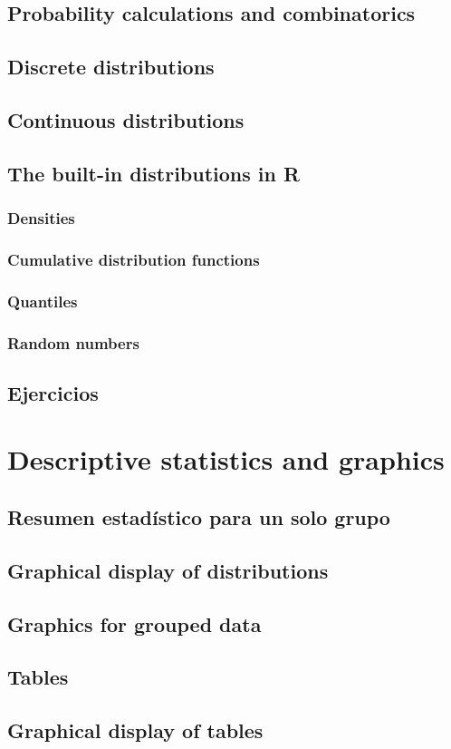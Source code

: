 \documentclass[spanish]{extbook}
\numberwithin{equation}{section}
\numberwithin{figure}{section}
\begin{document}
\section{Probability calculations and combinatorics}
\section{Discrete distributions}
\section{Continuous distributions}
\section{The built-in distributions in R}
\subsection{Densities}
\subsection{Cumulative distribution functions}
\subsection{Quantiles}
\subsection{Random numbers}
\section{Ejercicios}

\chapter{Descriptive statistics and graphics}
\section{Resumen estadístico para un solo grupo} \label{resestad}
\section{Graphical display of distributions}
\section{Graphics for grouped data}
\section{Tables} \label{tables}
\section{Graphical display of tables}
\end{document}
